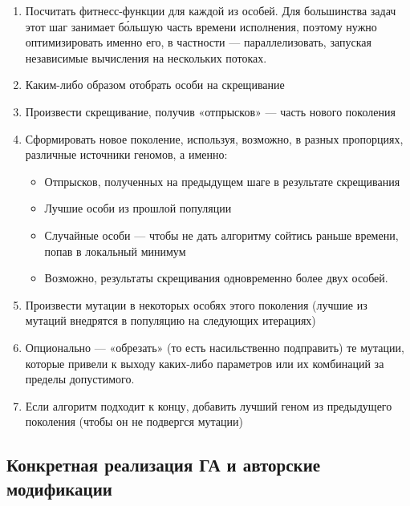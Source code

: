 \begin{enumerate}
    \item Посчитать фитнесс-функции для каждой из особей.
    Для большинства задач этот шаг занимает бо́льшую часть времени исполнения, поэтому нужно оптимизировать именно его, в частности — параллелизовать, запуская независимые вычисления на нескольких потоках.

    \item Каким-либо образом отобрать особи на скрещивание

    \item Произвести скрещивание, получив «отпрысков» — часть нового поколения

    \item Сформировать новое поколение, используя, возможно, в разных пропорциях, различные источники геномов, а именно:

    \begin{itemize}

        \item Отпрысков, полученных на предыдущем шаге в результате скрещивания
        \item Лучшие особи из прошлой популяции

        \item Случайные особи — чтобы не дать алгоритму сойтись раньше времени, попав в локальный минимум

        \item Возможно, результаты скрещивания одновременно более двух особей.

    \end{itemize}

    \item Произвести мутации в некоторых особях этого поколения (лучшие из мутаций внедрятся в популяцию на следующих итерациях)

    \item Опционально — «обрезать» (то есть насильственно подправить)
    те мутации, которые привели к выходу каких-либо параметров или их комбинаций за пределы допустимого.

    \item Если алгоритм подходит к концу, добавить лучший геном из предыдущего поколения (чтобы он не подвергся мутации)

\end{enumerate}

\subsection{Конкретная реализация ГА и авторские модификации}\label{subsec:my_modifications}

